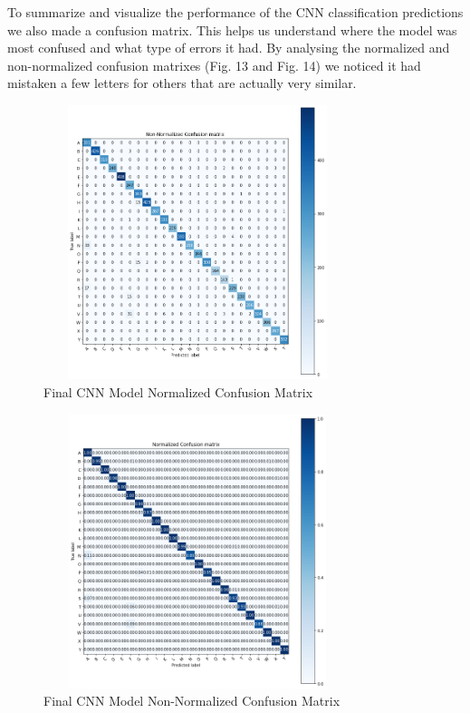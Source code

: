 \documentclass[conference]{IEEEtran}
\begin{document}
To summarize and visualize the performance of the CNN classification predictions we also made a confusion matrix. This helps us understand where the model was most confused and what type of errors it had. By analysing the normalized and non-normalized confusion matrixes (Fig. 13 and Fig. 14) we noticed it had mistaken a few letters for others that are actually very similar.

\begin{figure}[htbp]
    \centerline{\includegraphics[width=9cm,height=8cm]{img/non_normalized_confusion_matrix.png}}
    \caption{Final CNN Model Normalized Confusion Matrix}
    \label{fig:hist_train_classes}
\end{figure}


\begin{figure}[htbp]
    \centerline{\includegraphics[width=9cm,height=8cm]{img/normalized_confusion_matrix.png}}
    \caption{Final CNN Model Non-Normalized Confusion Matrix}
    \label{fig:hist_train_classes}
\end{figure}
\end{document}
